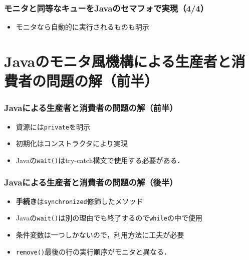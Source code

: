 \documentclass[dvipdfmx]{beamer}
\begin{document}
\begin{frame}
  \frametitle{モニタと同等なキューをJavaのセマフォで実現（4/4）}
  

  \begin{itemize}
  \item モニタなら自動的に実行されるものも明示
  \end{itemize}
\end{frame}

\section{Javaのモニタ風機構による生産者と消費者の問題の解（前半）}
\begin{frame}
  \frametitle{Javaによる生産者と消費者の問題の解（前半）}
  

  \begin{itemize}
  \item 資源には{\tt private}を明示
  \item 初期化はコンストラクタにより実現
  \item Javaの{\tt wait()}はtry-catch構文で使用する必要がある．
  \end{itemize}
\end{frame}

\begin{frame}
  \frametitle{Javaによる生産者と消費者の問題の解（後半）}
  

  \begin{itemize}
  \item {\bf 手続き}は{\tt synchronized}修飾したメソッド
  \item Javaの{\tt wait()}は別の理由でも終了するので{\tt while}の中で使用
  \item 条件変数は一つしかないので，利用方法に工夫が必要
  \item {\tt remove()}最後の行の実行順序がモニタと異なる．
  \end{itemize}
\end{frame}
\end{document}
